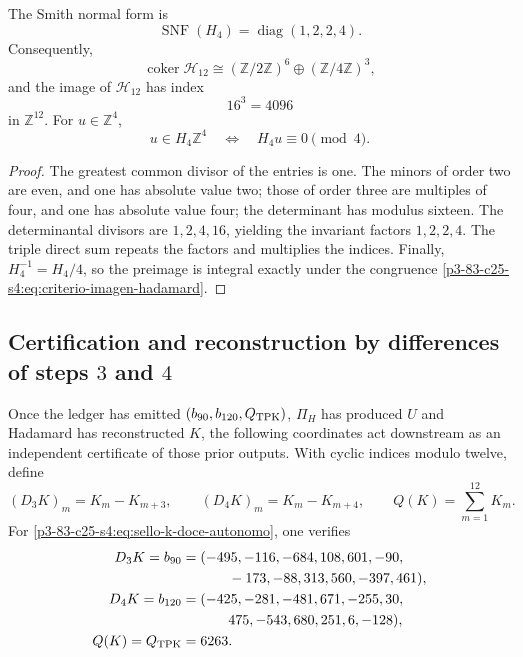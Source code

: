\begin{theorem}
\label{p3-83-c25-s4:thm:smith-hadamard-autonomo}
The Smith normal form is
\begin{equation}
 \operatorname{SNF}(H_4)=\operatorname{diag}(1,2,2,4).
 \label{p3-83-c25-s4:eq:snf-hadamard-autonoma}
\end{equation}
Consequently,
\begin{equation}
 \operatorname{coker}\mathcal H_{12}
 \cong(\mathbb Z/2\mathbb Z)^6
 \oplus(\mathbb Z/4\mathbb Z)^3,
 \label{p3-83-c25-s4:eq:cociente-hadamard-doce}
\end{equation}
and the image of \(\mathcal H_{12}\) has index
\[
 16^3=4096
\]
in \(\mathbb Z^{12}\). For \(u\in\mathbb Z^4\),
\begin{equation}
 u\in H_4\mathbb Z^4
 \quad\Longleftrightarrow\quad
 H_4u\equiv0\pmod4.
 \label{p3-83-c25-s4:eq:criterio-imagen-hadamard}
\end{equation}
\end{theorem}

\begin{proof}
The greatest common divisor of the entries is one. The minors of order two are
even, and one has absolute value two; those of order three are multiples of
four, and one has absolute value four; the determinant has modulus
sixteen. The determinantal divisors are \(1,2,4,16\), yielding
the invariant factors \(1,2,2,4\). The triple direct sum repeats the
factors and multiplies the indices. Finally,
\(H_4^{-1}=H_4/4\), so the preimage is integral exactly under the
congruence \eqref{p3-83-c25-s4:eq:criterio-imagen-hadamard}.
\end{proof}

\subsection{Certification and reconstruction by differences of steps \(3\) and \(4\)}

Once the ledger has emitted \((b_{90},b_{120},Q_{\rm TPK})\),
\(\Pi_H\) has produced \(U\) and Hadamard has reconstructed \(K\), the
following coordinates act downstream as an independent certificate of
those prior outputs. With cyclic indices modulo twelve, define
\begin{equation}
 (D_3K)_m=K_m-K_{m+3},
 \qquad
 (D_4K)_m=K_m-K_{m+4},
 \qquad
 Q(K)=\sum_{m=1}^{12}K_m.
 \label{p3-83-c25-s4:eq:extractor-diferencias-k}
\end{equation}
For \eqref{p3-83-c25-s4:eq:sello-k-doce-autonomo}, one verifies
\begin{align*}
 D_3K=b_{90}={}&(-495,-116,-684,108,601,-90,\\
         &\qquad-173,-88,313,560,-397,461),\\
 D_4K=b_{120}={}&(-425,-281,-481,671,-255,30,\\
         &\qquad475,-543,680,251,6,-128),\\
 Q(K)=Q_{\rm TPK}={}&6263.
\end{align*}

